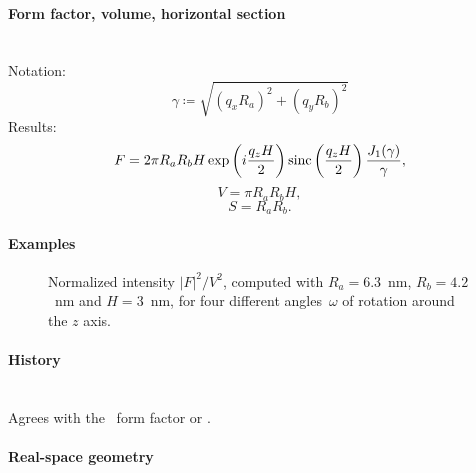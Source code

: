 \paragraph{Form factor, volume, horizontal section}\strut\\
Notation:
\begin{equation*}
  \gamma \coloneqq \sqrt{(q_x R_a)^2+(q_y R_b)^2}
\end{equation*}
Results:
\begin{equation*}
F = 2\pi R_a R_b H \exp\left(i\frac{q_z H}{2}\right)
   \operatorname{sinc}\left(\frac{q_z H}{2}\right) \frac{J_1(\gamma)}{\gamma},
\end{equation*}
\begin{equation*}
  V = \pi R_a R_bH,
\end{equation*}
\begin{equation*}
  S = R_a R_b.
\end{equation*}

\paragraph{Examples}\strut

\begin{figure}[H]
\begin{center}
\end{center}
\caption{Normalized intensity $|F|^2/V^2$,
computed with $R_a=6.3$~nm, $R_b=4.2$~nm and $H=3$~nm,
for four different angles~$\omega$ of rotation around the $z$ axis.}
\end{figure}

\paragraph{History}\strut\\
Agrees with the \IsGISAXS\ form factor
 \cite[Eq.~2.41, wrongly labeled in Fig.~2.4]{Laz08}
or  \cite[Eq.~224]{ReLL09}.


 \label{SFullSphere}

\paragraph{Real-space geometry}\strut\\

